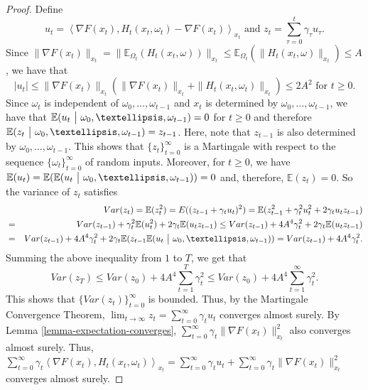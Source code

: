 \documentclass[10pt,a4paper]{amsart}
\newcommand{\E}{\mathbb{E}}
\newcommand{\g}{\gamma}
\begin{document}
\begin{proof}
Define 
\begin{equation}\label{eq-lemma-F-x-t-converge-1}
u_t = \left\langle \nabla F(x_t), H_t(x_t,\omega_t) - \nabla F(x_t)\right\rangle_{x_t} \text{ and  } z_t = \sum_{\tau=0}^t \g_\tau u_\tau.
\end{equation} 
Since $\|\nabla F(x_t)\|_{x_t} = \|\E_{\Omega_t}(H_t(x_t,\omega))\|_{x_t} \leq \E_{\Omega_t}(\|H_t(x_t,\omega)\|_{x_t}) \leq A$, we have that 
\[
|u_t| \leq \|\nabla F(x_t)\|_{x_t} (\|\nabla F(x_t)\|_{x_t} + \|H_t(x_t,\omega_t)\|_{x_t}) \leq 2A^2 \text{ for } t\geq 0.
\]
Since $\omega_t$ is independent of $\omega_0,\dots, \omega_{t-1}$ and $x_t$ is determined by $\omega_0,\dots, \omega_{t-1}$, we have that $\E(u_t~\big{|}~\omega_0,\dots,\omega_{t-1}) = 0$ for $t \geq 0$ and therefore $\E(z_t~\big{|}~\omega_0,\dots,\omega_{t-1})=z_{t-1}$. Here, note that $z_{t-1}$ is also determined by $\omega_0,\dots,\omega_{t-1}$. This shows that $\{z_t\}_{t=0}^\infty$ is a Martingale with respect to the sequence $\{\omega_t\}_{t=0}^\infty$ of random inputs. Moreover, for $t\geq 0$, we have $\E(u_t) = \E(\E(u_t~\big{|}~\omega_0,\dots,\omega_{t-1}))=0$ and, therefore, $\E(z_t)=0$. So the variance of $z_t$ satisfies
\begin{eqnarray*}
&& Var(z_t)  =  \E(z_t^2) =E((z_{t-1}+\g_t u_t)^2) = \E(z_{t-1}^2 + \g_t^2 u_t^2 +  2\g_t u_t z_{t-1}) \\
& = &   Var(z_{t-1}) + \g_t^2\E(u_t^2) + 2 \g_t\E( u_t z_{t-1}) \leq  Var(z_{t-1}) + 4A^4\g_t^2 + 2\g_t \E(u_t z_{t-1}) \\
& = & Var(z_{t-1}) + 4A^4\g_t^2+ 2\g_t \E(z_{t-1}\E(u_t ~\big{|}~\omega_0,\dots,\omega_{t-1})) = Var(z_{t-1}) + 4A^4\g_t^2.
\end{eqnarray*}
Summing the above inequality from $1$ to $T$, we get that 
\[
Var(z_T) \leq Var(z_0) + 4A^4\sum_{t=1}^T \g_t^2 \leq Var(z_0) + 4A^4\sum_{t=1}^\infty \g_t^2.
\] 
This shows that $\{Var(z_t)\}_{t=0}^\infty$ is bounded. Thus, by the Martingale Convergence Theorem, $\lim_{t\rightarrow \infty}z_t =  \sum_{t=0}^\infty \g_t u_t$ converges almost surely. By Lemma \ref{lemma-expectation-converges}, $\sum_{t=0}^\infty \g_t \|\nabla F(x_t)\|_{x_t}^2$ also converges almost surely. Thus, $\sum_{t=0}^\infty \g_t \left\langle \nabla F(x_t), H_t(x_t,\omega_t)\right\rangle_{x_t} = \sum_{t=0}^\infty \g_t u_t + \sum_{t=0}^\infty \g_t \|\nabla F(x_t)\|_{x_t}^2$ converges almost surely.


\end{proof}
\end{document}

